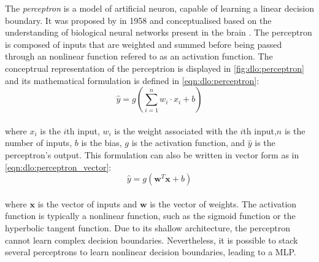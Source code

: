 The \emph{perceptron} is a model of artificial neuron, capable of learning a
linear decision boundary. It was proposed by
\citeauthor{rosenblatt1958perceptron} in 1958 \cite{rosenblatt1958perceptron}
and conceptualised based on the understanding of biological neural networks
present in the brain \cite{mcculloch1943logical,hebb2005organization}. The
perceptron is composed of inputs that are weighted and summed before being
passed through an nonlinear function refered to as an activation function. The
conceptrual representation of the perceptrion is displayed in
\cref{fig:dlo:perceptron} and its mathematical formulation is defined in
\cref{eqn:dlo:perceptron}: \\

\begin{equation}
  \label{eqn:dlo:perceptron}
\hat{y} = g(\sum_{i=1}^{n} w_i \cdot x_i + b)
\end{equation} \\



\noindent where $x_i$ is the $i$th input, $w_i$ is the weight associated with
the $i$th input,$n$ is the number of inputs, $b$ is the bias, $g$ is the
activation function, and $\hat{y}$ is the perceptron's output. This formulation
can also be written in vector form as in \cref{eqn:dlo:perceptron_vector}: \\

\begin{equation}
  \label{eqn:dlo:perceptron_vector}
  \hat{y} = g(\mathbf{w}^T \mathbf{x} + b)
\end{equation}\\

\noindent where $\mathbf{x}$ is the vector of inputs and $\mathbf{w}$ is the
vector of weights. The activation function is typically a nonlinear function,
such as the sigmoid function or the hyperbolic tangent function. Due to its
shallow architecture, the perceptron cannot learn complex decision boundaries.
Nevertheless, it is possible to stack several perceptrons to learn nonlinear
decision boundaries, leading to a \acl{MLP}.\\

